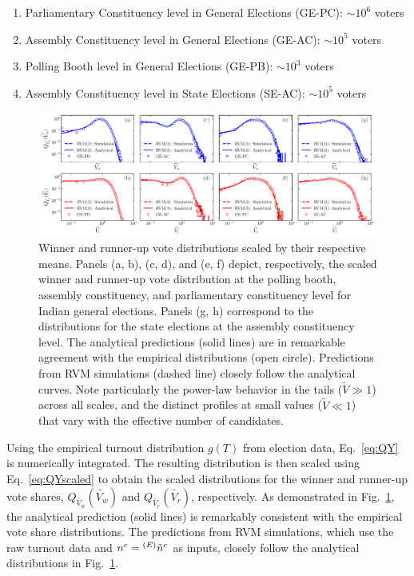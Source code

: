 \begin{enumerate}
    \item Parliamentary Constituency level in General Elections (GE-PC): $\sim 10^6$ voters
    \item Assembly Constituency level in General Elections (GE-AC): $\sim 10^5$ voters
    \item Polling Booth level in General Elections (GE-PB): $\sim 10^3$ voters
    \item Assembly Constituency level in State Elections (SE-AC): $\sim 10^5$ voters
\end{enumerate}
\begin{figure}[H]
    \centering
    \includegraphics[width=\linewidth]{chapters/chapter6/winner_runnerup_dist_india.pdf}
    \caption{Winner and runner-up vote distributions scaled by their respective means. Panels (a, b), (c, d), and (e, f) depict, respectively, the scaled winner and runner-up vote distribution at the polling booth, assembly constituency, and parliamentary constituency level for Indian general elections. Panels (g, h) correspond to the distributions for the state elections at the assembly constituency level. The analytical predictions (solid lines) are in remarkable agreement with the empirical distributions (open circle). Predictions from RVM simulations (dashed line) closely follow the analytical curves. Note particularly the power-law behavior in the tails ($\widetilde{V} \gg 1$) across all scales, and the distinct profiles at small values ($\widetilde{V} \ll 1$) that vary with the effective number of candidates.}
    \label{fig:winner_runnerup_dist_india}
\end{figure}
Using the empirical turnout distribution $g(T)$ from election data, Eq.~\ref{eq:QY} is numerically integrated. The resulting distribution is then scaled using Eq.~\ref{eq:QYscaled} to obtain the scaled distributions for the winner and runner-up vote shares, $ Q_{\widetilde{V_w}}(\widetilde{V_w})$ and $Q_{\widetilde{V_r}}(\widetilde{V_r})$, respectively. As demonstrated in Fig.~\ref{fig:winner_runnerup_dist_india}, the analytical prediction (solid lines) is remarkably consistent with the empirical vote share distributions. The predictions from RVM simulations, which use the raw turnout data and $n^c = {^{(E)}\Tilde{n}^c}$ as inputs, closely follow the analytical distributions in Fig.~\ref{fig:winner_runnerup_dist_india}.


